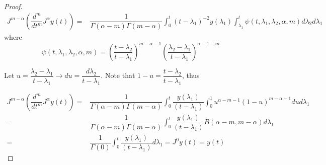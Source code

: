 \begin{proof}
\begin{align*}
    J^{m-\alpha}\left(\dfrac{d^m}{dt^m}J^\alpha y(t)\right)=& \dfrac{1}{\Gamma(\alpha-m)\Gamma{(m-\alpha)}}\int_0^t(t-\lambda_1)^{-2}y(\lambda_1)\int_{\lambda_1}^{t} \psi(t,\lambda_1,\lambda_2,\alpha,m)d\lambda_2d\lambda_1
\end{align*}
where
\begin{equation*}
\psi(t,\lambda_1,\lambda_2,\alpha,m)=\left(\dfrac{t-\lambda_2}{t-\lambda_1}\right)^{m-\alpha-1}\left(\dfrac{\lambda_2-\lambda_1}{t-\lambda_1}\right)^{\alpha-1-m}
\end{equation*}


Let $u=\dfrac{\lambda_2-\lambda_1}{t-\lambda_1}\rightarrow du=\dfrac{d\lambda_2}{t-\lambda_1}$. Note that $1-u=\dfrac{t-\lambda_2}{t-\lambda_1}$, thus

\begin{align*}
    J^{m-\alpha}\left(\dfrac{d^m}{dt^m}J^\alpha y(t)\right)=& \dfrac{1}{\Gamma(\alpha-m)\Gamma{(m-\alpha)}}\int_0^t\dfrac{y(\lambda_1)}{(t-\lambda_1)}\int_{0}^{1}u^{\alpha-m-1}(1-u)^{m-\alpha-1}dud\lambda_1\\
    =& \dfrac{1}{\Gamma(\alpha-m)\Gamma{(m-\alpha)}}\int_0^t\dfrac{y(\lambda_1)}{(t-\lambda_1)} B(\alpha-m,m-\alpha)d\lambda_1\\
    =& \dfrac{1}{\Gamma(0)}\int_0^t\dfrac{y(\lambda_1)}{(t-\lambda_1)}d\lambda_1=J^0y(t)=y(t)
\end{align*}
    
        
    \end{proof}
    
